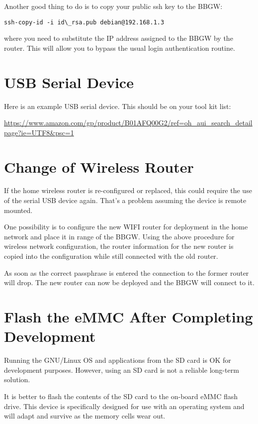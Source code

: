 Another good thing to do is to copy your public ssh key to the BBGW:

\begin{verbatim}
ssh-copy-id -i id\_rsa.pub debian@192.168.1.3
\end{verbatim}

where you need to substitute the IP address assigned to the BBGW by the 
router.  This will allow you to bypass the usual login authentication routine.

\section{USB Serial Device}

Here is an example USB serial device.  This should be on your tool kit list:

\url{https://www.amazon.com/gp/product/B01AFQ00G2/ref=oh_aui_search_detailpage?ie=UTF8&psc=1}

\section{Change of Wireless Router}

If the home wireless router is re-configured or replaced, this could require 
the use of the serial USB device again.  That's a problem assuming the device 
is remote mounted.

One possibility is to configure the new WIFI router for deployment in the home 
network and place it in range of the BBGW.  Using the above procedure for 
wireless network configuration, the router information for the new router is 
copied into the configuration while still connected with the old router.

As soon as the correct passphrase is entered the connection to the former 
router will drop.  The new router can now be deployed and the BBGW will connect 
to it.

\section{Flash the eMMC After Completing Development}

Running the GNU/Linux OS and applications from the SD card is OK for 
development purposes.  However, using an SD card is not a reliable long-term 
solution.

It is better to flash the contents of the SD card to the on-board eMMC flash 
drive.  This device is specifically designed for use with an operating system 
and will adapt and survive as the memory cells wear out.

